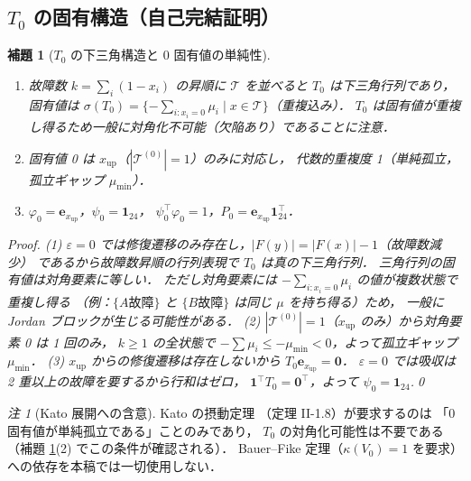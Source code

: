 \documentclass[12pt,a4paper]{article}
\theoremstyle{plain}
\newtheorem{lemma}[theorem]{補題}
\theoremstyle{definition}
\theoremstyle{remark}
\newtheorem{remark}[theorem]{注}
\newcommand{\calT}{\mathcal{T}}
\newcommand{\eps}{\varepsilon}
\newcommand{\Proj}{P}
\begin{document}
\subsection{$T_0$ の固有構造（自己完結証明）}

\begin{lemma}[$T_0$ の下三角構造と 0 固有値の単純性]\label{lem:T0spec}
  \begin{enumerate}[label=(\arabic*)]
    \item 故障数 $k=\sum_i(1-x_i)$ の昇順に $\calT$ を並べると
          $T_0$ は下三角行列であり，
          固有値は $\sigma(T_0)=\{-\sum_{i:x_i=0}\mu_i \mid x\in\calT\}$（重複込み）．
          $T_0$ は固有値が重複し得るため一般に対角化不可能（欠陥あり）であることに注意．

    \item 固有値 0 は $x_{\mathrm{up}}$（$|\calT^{(0)}|=1$）のみに対応し，
          代数的重複度 1（単純孤立，孤立ギャップ $\mu_{\min}$）．

    \item $\varphi_0 = \mathbf{e}_{x_{\mathrm{up}}}$，$\psi_0 = \mathbf{1}_{24}$，
          $\psi_0^\top\varphi_0=1$，$\Proj_0 = \mathbf{e}_{x_{\mathrm{up}}}\mathbf{1}_{24}^\top$．
  \end{enumerate}

  \begin{proof}
    (1) $\eps=0$ では修復遷移のみ存在し，$|F(y)|=|F(x)|-1$（故障数減少）
    であるから故障数昇順の行列表現で $T_0$ は真の下三角行列．
    三角行列の固有値は対角要素に等しい．
    ただし対角要素には $-\sum_{i:x_i=0}\mu_i$ の値が複数状態で重複し得る
    （例：$\{A\text{故障}\}$ と $\{B\text{故障}\}$ は同じ $\mu$ を持ち得る）ため，
    一般に Jordan ブロックが生じる可能性がある．
    (2) $|\calT^{(0)}|=1$（$x_{\mathrm{up}}$ のみ）から対角要素 0 は 1 回のみ，
    $k\ge1$ の全状態で $-\sum\mu_i \le -\mu_{\min}<0$，よって孤立ギャップ $\mu_{\min}$．
    (3) $x_{\mathrm{up}}$ からの修復遷移は存在しないから $T_0\mathbf{e}_{x_{\mathrm{up}}}=\mathbf{0}$．
    $\eps=0$ では吸収は 2 重以上の故障を要するから行和はゼロ，
    $\mathbf{1}^\top T_0=\mathbf{0}^\top$，よって $\psi_0=\mathbf{1}_{24}$.\qed
  \end{proof}
\end{lemma}

\begin{remark}[Kato 展開への含意]
  Kato の摂動定理 \cite{kato1995}（定理 II-1.8）が要求するのは
  「0 固有値が単純孤立である」ことのみであり，
  $T_0$ の対角化可能性は不要である（補題 \ref{lem:T0spec}(2) でこの条件が確認される）．
  Bauer--Fike 定理（$\kappa(V_0)=1$ を要求）への依存を本稿では一切使用しない．
\end{remark}
\end{document}
